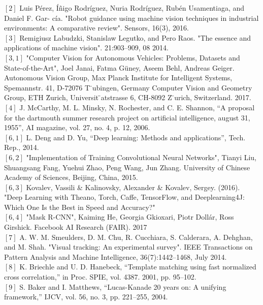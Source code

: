 \documentclass{bmvc2k}
\begin{document}
$\left[2\right]$  Luis Pérez, Íñigo Rodríguez, Nuria Rodríguez, Rubén Usamentiaga, and Daniel F. Gar-
cía.   "Robot  guidance  using  machine  vision  techniques  in  industrial  environments:  A comparative review". Sensors, 16(3), 2016. \\
$\left[3\right]$  Remigiusz Labudzki, Stanislaw Legutko, and Pero Raos.  "The essence and applications
of machine vision". 21:903–909, 08 2014.\\
$\left[3,1\right]$  "Computer Vision for Autonomous Vehicles: Problems, Datasets and State-of-the-Art",
Joel Janai, Fatma Güney, Aseem Behl, Andreas Geiger. Autonomous Vision Group, Max Planck Institute for Intelligent Systems, Spemannstr. 41, D-72076 T  ̈ubingen, Germany
Computer Vision and Geometry Group, ETH Z̈urich, Universit ̈atstrasse 6, CH-8092 Z  ̈urich, Switzerland. 2017.\\
$\left[4\right]$  J. McCarthy, M. L. Minsky, N. Rochester, and C. E. Shannon, “A proposal for the
dartmouth summer research project on artificial intelligence, august 31, 1955”, AI
magazine, vol. 27, no. 4, p. 12, 2006.\\
$\left[6,1\right]$  L. Deng and D. Yu, “Deep learning: Methods and applications”, Tech. Rep.,
2014. \\
$\left[6,2\right]$  "Implementation of Training Convolutional Neural Networks", Tianyi Liu, Shuangsang Fang, Yuehui Zhao, Peng Wang, Jun Zhang. University
of
Chinese
Academy
of
Sciences,
Beijing,
China, 2015.\\
$\left[6,3\right]$  Kovalev, Vassili & Kalinovsky, Alexander & Kovalev, Sergey. (2016). "Deep Learning with Theano, Torch, Caffe, TensorFlow, and Deeplearning4J: Which One Is the Best in Speed and Accuracy?"\\
$\left[6,4\right]$  "Mask R-CNN", Kaiming He, Georgia Gkioxari, Piotr Dollár, Ross Girshick. Facebook AI Research (FAIR). 2017\\
$\left[7\right]$  A. W. M. Smeulders, D. M. Chu, R. Cucchiara, S. Calderara, A. Dehghan, and
M. Shah. "Visual tracking: An experimental survey". IEEE Transactions on Pattern
Analysis and Machine Intelligence, 36(7):1442–1468, July 2014.\\
$\left[8\right]$  K. Briechle and U. D. Hanebeck, “Template matching using fast
normalized  cross  correlation,”  in Proc.  SPIE,  vol.  4387.  2001, pp. 95–102.\\
$\left[9\right]$  S. Baker and I. Matthews, “Lucas-Kanade 20 years on: A unifying framework,” IJCV, vol. 56, no. 3, pp. 221–255, 2004.\\
\end{document}
